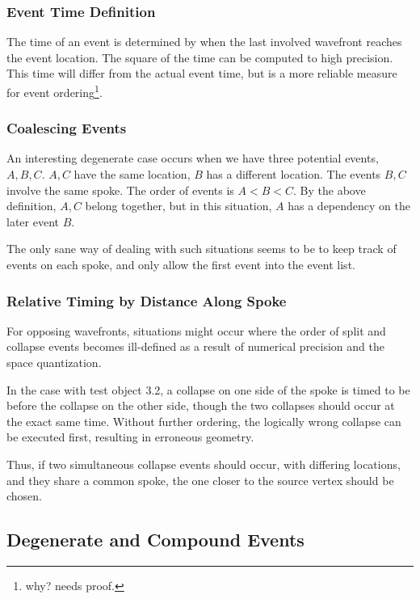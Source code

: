 \documentclass[12pt,a4paper,oneside,openany]{article}
\begin{document}
\subsubsection{Event Time Definition}

The time of an event is determined by when the last involved wavefront reaches the event location. The square of the time can be computed to high precision. This time will differ from the actual event time, but is a more reliable measure for event ordering\footnote{why? needs proof.}.

\subsubsection{Coalescing Events}

An interesting degenerate case occurs when we have three potential events, $A,B,C$. $A,C$ have the same location, $B$ has a different location. The events $B,C$ involve the same spoke. The order of events is $A < B < C$. By the above definition, $A,C$ belong together, but in this situation, $A$ has a dependency on the later event $B$.

The only sane way of dealing with such situations seems to be to keep track of events on each spoke, and only allow the first event into the event list.

\subsubsection{Relative Timing by Distance Along Spoke}

For opposing wavefronts, situations might occur where the order of split and collapse events becomes ill-defined as a result of numerical precision and the space quantization.

In the case with test object 3.2, a collapse on one side of the spoke is timed to be before the collapse on the other side, though the two collapses should occur at the exact same time. Without further ordering, the logically wrong collapse can be executed first, resulting in erroneous geometry.

Thus, if two simultaneous collapse events should occur, with differing locations, and they share a common spoke, the one closer to the source vertex should be chosen.

\subsection{Degenerate and Compound Events}
\end{document}
